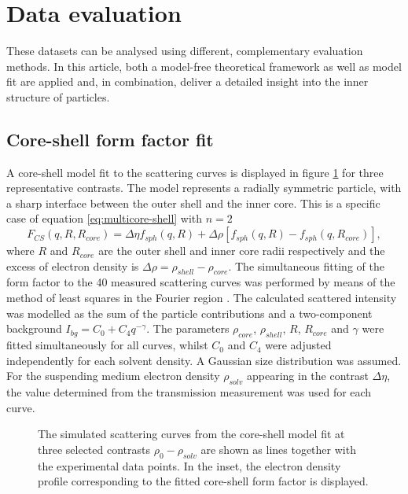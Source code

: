 \section{Data evaluation}
\label{sec:KiskerResultsEvaluation}

These datasets can be analysed using different, complementary evaluation methods. In this article, both a model-free theoretical framework as well as model fit are applied and, in combination, deliver a detailed insight into the inner structure of particles.


\subsection{Core-shell form factor fit}
\label{sec:coreshell_fit}
A core-shell model fit to the scattering curves is displayed in figure \ref{fig:KiskerSAXSCoreshellFit} for three representative contrasts. The model represents a radially symmetric particle, with a sharp interface between the outer shell and the inner core. This is a specific case of equation \eqref{eq:multicore-shell} with \( n=2 \)
\begin{equation}
F_{CS}(q,R,R_{core})=\Delta\eta f_{sph}(q,R)+\Delta\rho\left[ f_{sph}(q,R)-f_{sph}(q,R_{core}) \right] ,
\label{eq:ff_cs}
\end{equation}
where \(R \) and \(R_{core} \)  are the outer shell and inner core radii respectively and the excess of electron density is \(\Delta\rho=\rho_{shell}-\rho_{core}\). The simultaneous fitting of the form factor to the 40 measured scattering curves was performed by means of the method of least squares in the Fourier region \citet{pedersen_analysis_1997}. The calculated scattered intensity was modelled as the sum of the particle contributions and a two-component background \(I_{bg}=C_0+C_4q^{-\gamma} \). The parameters \(\rho_{core}\), \(\rho_{shell}\), \(R\), \(R_{core}\) and \(\gamma\) were fitted simultaneously for all curves, whilst \( C_0 \) and \( C_4 \) were adjusted independently for each solvent density. A Gaussian size distribution was assumed. For the suspending medium electron density \( \rho_{solv} \) appearing in the contrast \( \Delta\eta \), the value determined from the transmission measurement was used for each curve.

\begin{figure}%
	\centering
		
		\caption{ The simulated scattering curves from the core-shell model fit at three selected contrasts $\rho_0-\rho_{solv}$ are shown as lines together with the experimental data points. In the inset, the electron density profile corresponding to the fitted core-shell form factor is displayed.}
		\label{fig:KiskerSAXSCoreshellFit}
\end{figure}

